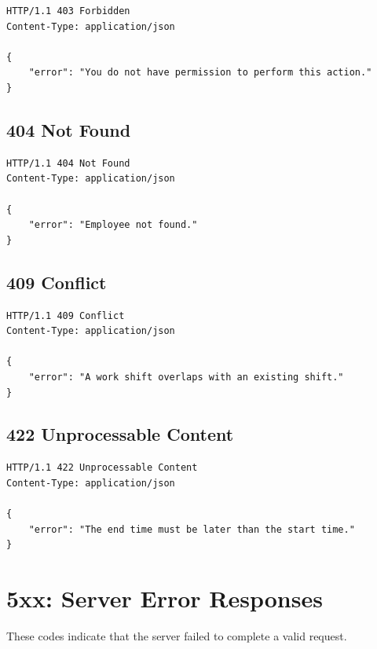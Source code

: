 \documentclass[a4paper]{article}
\begin{document}
            \begin{lstlisting}[style=httpstyle]
HTTP/1.1 403 Forbidden
Content-Type: application/json

{
    "error": "You do not have permission to perform this action."
}
            \end{lstlisting}
        
        \subsection{404 Not Found}
            
            \begin{lstlisting}[style=httpstyle]
HTTP/1.1 404 Not Found
Content-Type: application/json

{
    "error": "Employee not found."
}
            \end{lstlisting}
        
        \subsection{409 Conflict}
            
            \begin{lstlisting}[style=httpstyle]
HTTP/1.1 409 Conflict
Content-Type: application/json

{
    "error": "A work shift overlaps with an existing shift."
}
            \end{lstlisting}
        
        \subsection{422 Unprocessable Content}
            
            \begin{lstlisting}[style=httpstyle]
HTTP/1.1 422 Unprocessable Content
Content-Type: application/json

{
    "error": "The end time must be later than the start time."
}
            \end{lstlisting}
    
    
    \section{5xx: Server Error Responses}
        
        These codes indicate that the server failed to complete a valid request.
        
\end{document}
